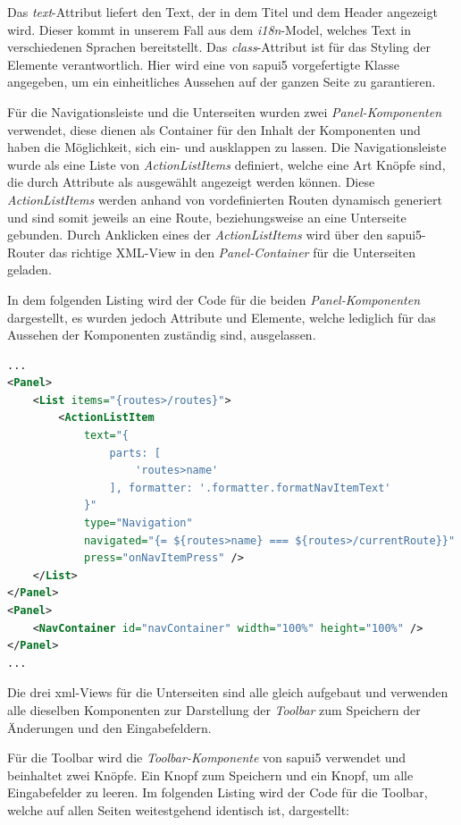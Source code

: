 Das \textit{text}-Attribut liefert den Text, der in dem Titel und dem Header angezeigt wird.
Dieser kommt in unserem Fall aus dem \textit{i18n}-Model, welches Text in verschiedenen Sprachen bereitstellt.
Das \textit{class}-Attribut ist für das Styling der Elemente verantwortlich. 
Hier wird eine von \gls{sapui5} vorgefertigte Klasse angegeben, um ein einheitliches Aussehen auf der ganzen Seite zu garantieren.

Für die Navigationsleiste und die Unterseiten wurden zwei \textit{Panel-Komponenten} verwendet, diese dienen als Container für den Inhalt der Komponenten und haben die Möglichkeit, sich ein- und ausklappen zu lassen.
Die Navigationsleiste wurde als eine Liste von \textit{ActionListItems} definiert, welche eine Art Knöpfe sind, die durch Attribute als ausgewählt angezeigt werden können.
Diese \textit{ActionListItems} werden anhand von vordefinierten Routen dynamisch generiert und sind somit jeweils an eine Route, beziehungsweise an eine Unterseite gebunden.
Durch Anklicken eines der \textit{ActionListItems} wird über den \gls{sapui5}-Router das richtige XML-View in den \textit{Panel-Container} für die Unterseiten geladen.

In dem folgenden Listing wird der Code für die beiden \textit{Panel-Komponenten} dargestellt, es wurden jedoch Attribute und Elemente, welche lediglich für das Aussehen der Komponenten zuständig sind, ausgelassen. 

\begin{lstlisting}[caption={Navigationsleisten- und Unterseiten-Container des Admin-UIs}, language={XML}]
...
<Panel>
    <List items="{routes>/routes}">
        <ActionListItem
            text="{
                parts: [
                    'routes>name'
                ], formatter: '.formatter.formatNavItemText'
            }"
            type="Navigation"
            navigated="{= ${routes>name} === ${routes>/currentRoute}}"
            press="onNavItemPress" />
    </List>
</Panel>
<Panel>
    <NavContainer id="navContainer" width="100%" height="100%" />
</Panel>
...
\end{lstlisting}

Die drei \gls{xml}-Views für die Unterseiten sind alle gleich aufgebaut und verwenden alle dieselben Komponenten zur Darstellung der \textit{Toolbar} zum Speichern der Änderungen und den Eingabefeldern.

Für die Toolbar wird die \textit{Toolbar-Komponente} von \gls{sapui5} verwendet und beinhaltet zwei Knöpfe.
Ein Knopf zum Speichern und ein Knopf, um alle Eingabefelder zu leeren. 
Im folgenden Listing wird der Code für die Toolbar, welche auf allen Seiten weitestgehend identisch ist, dargestellt:


